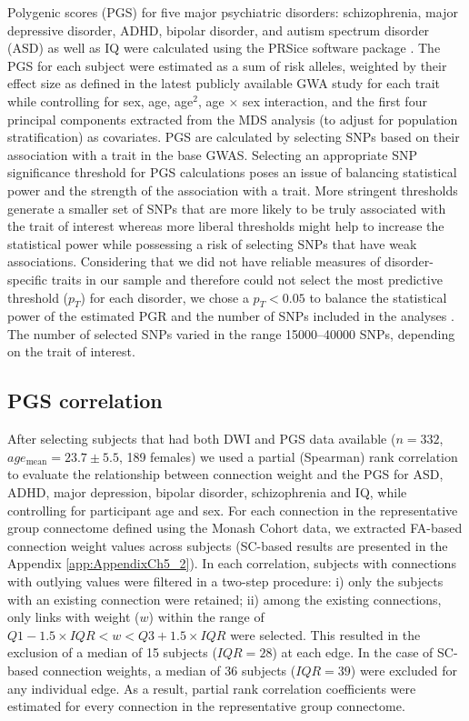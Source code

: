 Polygenic scores (PGS) for five major psychiatric disorders: schizophrenia, major depressive disorder, ADHD, bipolar disorder, and autism spectrum disorder (ASD) as well as IQ were calculated using the PRSice software package \citep{Euesden2015}. The PGS for each subject were estimated as a sum of risk alleles, weighted by their effect size as defined in the latest publicly available GWA study for each trait \citep{Neale2010,Ripke2014a,Ruderfer2018,Savage2018,AutismConsortium2017,Wray2018} while controlling for sex, age, age$^{2}$, age $\times$ sex interaction, and the  first four principal components extracted from the MDS analysis (to adjust for population stratification) as covariates. PGS are calculated by selecting SNPs based on their association with a trait in the base GWAS. Selecting an appropriate SNP significance threshold for PGS calculations poses an issue of balancing statistical power and the strength of the association with a trait. More stringent thresholds generate a smaller set of SNPs that are more likely to be truly associated with the trait of interest whereas more liberal thresholds might help to increase the statistical power while possessing a risk of selecting SNPs that have weak associations. Considering that we did not have reliable measures of disorder-specific traits in our sample and therefore could not select the most predictive threshold ($p_{T}$) for each disorder, we chose a $p_{T}<0.05$ to balance the statistical power of the estimated PGR and the number of SNPs included in the analyses \citep{Ripke2014a}. The number of selected SNPs varied in the range \num{15 000}--\num{40 000} SNPs, depending on the trait of interest.

\subsection{PGS correlation}

After selecting subjects that had both DWI and PGS data available ($n= 332$, $age_\mathrm{mean} = 23.7 \pm 5.5$, 189 females) we used a partial (Spearman) rank correlation to evaluate the relationship between connection weight and the PGS for ASD, ADHD, major depression, bipolar disorder, schizophrenia and IQ, while controlling for participant age and sex. For each connection in the representative group connectome defined using the Monash Cohort data, we extracted FA-based connection weight values across subjects (SC-based results are presented in the Appendix \ref{app:AppendixCh5_2}). In each correlation, subjects with connections with outlying values were filtered in a two-step procedure: i) only the subjects with an existing connection were retained; ii) among the existing connections, only links with weight ($w$) within the range of $Q1-1.5 \times IQR< w <Q3+1.5 \times IQR$ were selected. This resulted in the exclusion of a median of 15 subjects ($IQR = 28$) at each edge. In the case of SC-based connection weights, a median of 36 subjects ($IQR=39$) were excluded for any individual edge. As a result, partial rank correlation coefficients were estimated for every connection in the representative group connectome.

